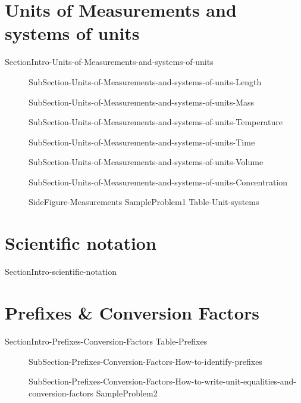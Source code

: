 \documentclass[main.tex]{subfiles}
\newcommand\chapterlabel{Ch-measurements}\setcounter{figurenewcounter}{0}\setcounter{tablenewcounter}{0}\setcounter{formulanewcounter}{0}
\begin{document}
\section{Units of Measurements and systems of units}
{SectionIntro-Units-of-Measurements-and-systems-of-units}
\sloppy\begin{description}
\item[]{SubSection-Units-of-Measurements-and-systems-of-units-Length}
\item[]{SubSection-Units-of-Measurements-and-systems-of-units-Mass}
\item[]{SubSection-Units-of-Measurements-and-systems-of-units-Temperature}
\item[]{SubSection-Units-of-Measurements-and-systems-of-units-Time}
\item[]{SubSection-Units-of-Measurements-and-systems-of-units-Volume}
\item[]{SubSection-Units-of-Measurements-and-systems-of-units-Concentration}

{SideFigure-Measurements}
{SampleProblem1}
{Table-Unit-systems}
\end{description}

\section{Scientific notation} {SectionIntro-scientific-notation}

 

\section{Prefixes \& Conversion Factors}
{SectionIntro-Prefixes-Conversion-Factors}
{Table-Prefixes}
\sloppy\begin{description}
\item[]{SubSection-Prefixes-Conversion-Factors-How-to-identify-prefixes}
\item[]{SubSection-Prefixes-Conversion-Factors-How-to-write-unit-equalities-and-conversion-factors}
{SampleProblem2}
\end{description}
\end{document}
